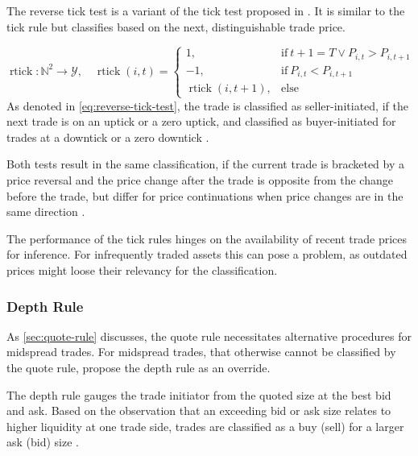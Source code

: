 The reverse tick test is a variant of the tick test proposed in \textcite[][241]{hasbrouckTradesQuotesInventories1988}. It is similar to the tick rule but classifies based on the next, distinguishable trade price.

\begin{equation}
    \operatorname{rtick} \colon \mathbb{N}^2 \to \mathcal{Y},\quad
    \operatorname{rtick}(i, t)=
    \begin{cases}
        1,                            & \mathrm{if}\ t+1=T \lor P_{i, t} > P_{i, t+1} \\
        -1,                           & \mathrm{if}\ P_{i, t} < P_{i, t+1}            \\
        \operatorname{rtick}(i, t+1), & \mathrm{else}
    \end{cases}
    \label{eq:reverse-tick-test}
\end{equation}
As denoted in \cref{eq:reverse-tick-test}, the trade is classified as seller-initiated, if the next trade is on an uptick or a zero uptick, and classified as buyer-initiated for trades at a downtick or a zero downtick \autocite[][735--636]{leeInferringTradeDirection1991}.

Both tests result in the same classification, if the current trade is bracketed by a price reversal and the price change after the trade is opposite from the change before the trade, but differ for price continuations when price changes are in the same direction \autocite[][736]{leeInferringTradeDirection1991}.

The performance of the tick rules hinges on the availability of recent trade prices for inference. For infrequently traded assets this can pose a problem, as outdated prices might loose their relevancy for the classification.

\subsubsection{Depth Rule}\label{sec:depth-rule}

As \cref{sec:quote-rule} discusses, the quote rule necessitates alternative procedures for midspread trades. For midspread trades, that otherwise cannot be classified by the quote rule, \textcite[][14]{grauerOptionTradeClassification2022} propose the depth rule as an override.

The depth rule gauges the trade initiator from the quoted size at the best bid and ask. Based on the observation that an exceeding bid or ask size relates to higher liquidity at one trade side, trades are classified as a buy (sell) for a larger ask (bid) size \autocite[][14]{grauerOptionTradeClassification2022}.

